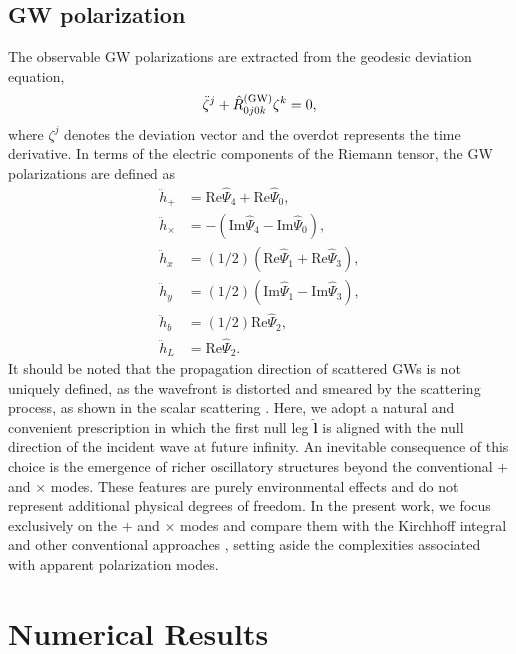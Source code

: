 \documentclass[reprint,amsmath,amssymb,aps,prd]{revtex4-2}
\begin{document}
\subsection{GW polarization}
The observable GW polarizations are extracted from the geodesic deviation equation,
\begin{equation}
\ddot{\zeta}^j+\hat{R}^{\rm(GW)}_{0j0k}\zeta^{k}=0,
\end{equation}
where $\zeta^j$ denotes the deviation vector and the overdot represents the time derivative. In terms of the electric components of the Riemann tensor, the GW polarizations are defined as \cite{Hyun_2019}
\begin{subequations}
\label{eq_4:GW_polarizations}
\begin{align}
\ddot{h}_{+}&=\mathrm{Re}\hat{\Psi}_{4}+\mathrm{Re}\hat{\Psi}_{0},\label{eq_4:h_plus}\\
\ddot{h}_{\times}&=-(\mathrm{Im}\hat{\Psi}_{4}-\mathrm{Im}\hat{\Psi}_{0}),\label{eq_4:h_cross}\\
\ddot{h}_{x}&=(1/2)(\mathrm{Re}\hat{\Psi}_{1}
+\mathrm{Re}\hat{\Psi}_{3}),\\
\ddot{h}_{y}&=(1/2)(\mathrm{Im}\hat{\Psi}_{1}
-\mathrm{Im}\hat{\Psi}_{3}),\\
\ddot{h}_{b}&=(1/2)\mathrm{Re}\hat{\Psi}_{2},\\
\ddot{h}_{L}&=\mathrm{Re}\hat{\Psi}_{2}.
\end{align}
\end{subequations}
It should be noted that the propagation direction of scattered GWs is not uniquely defined, as the wavefront is distorted and smeared by the scattering process, as shown in the scalar scattering \cite{Li_2025_b}. Here, we adopt a natural and convenient prescription in which the first null leg $\hat{\bm{l}}$ is aligned with the null direction of the incident wave at future infinity. An inevitable consequence of this choice is the emergence of richer oscillatory structures beyond the conventional $+$ and $\times$ modes. These features are purely environmental effects and do not represent additional physical degrees of freedom. In the present work, we focus exclusively on the $+$ and $\times$ modes and compare them with the Kirchhoff integral \cite{Takahashi_2003} and other conventional approaches \cite{Pijnenburg_2024b,Chan_2025}, setting aside the complexities associated with apparent polarization modes.

\section{\label{sec:numerical_results}Numerical Results}
\end{document}
